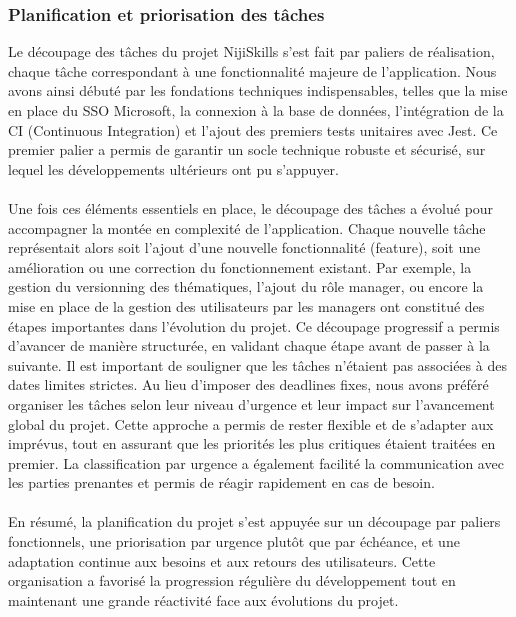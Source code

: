 \documentclass[12pt]{article}
\begin{document}
\subsubsection{Planification et priorisation des tâches}
Le découpage des tâches du projet NijiSkills s’est fait par paliers de réalisation, chaque tâche correspondant à une fonctionnalité majeure de l’application. Nous avons ainsi débuté par les fondations techniques indispensables, telles que la mise en place du SSO Microsoft, la connexion à la base de données, l’intégration de la CI (Continuous Integration) et l’ajout des premiers tests unitaires avec Jest. Ce premier palier a permis de garantir un socle technique robuste et sécurisé, sur lequel les développements ultérieurs ont pu s’appuyer.
\\\\
Une fois ces éléments essentiels en place, le découpage des tâches a évolué pour accompagner la montée en complexité de l’application. Chaque nouvelle tâche représentait alors soit l’ajout d’une nouvelle fonctionnalité (feature), soit une amélioration ou une correction du fonctionnement existant. Par exemple, la gestion du versionning des thématiques, l’ajout du rôle manager, ou encore la mise en place de la gestion des utilisateurs par les managers ont constitué des étapes importantes dans l’évolution du projet. Ce découpage progressif a permis d’avancer de manière structurée, en validant chaque étape avant de passer à la suivante.
Il est important de souligner que les tâches n’étaient pas associées à des dates limites strictes. Au lieu d’imposer des deadlines fixes, nous avons préféré organiser les tâches selon leur niveau d’urgence et leur impact sur l’avancement global du projet. Cette approche a permis de rester flexible et de s’adapter aux imprévus, tout en assurant que les priorités les plus critiques étaient traitées en premier. La classification par urgence a également facilité la communication avec les parties prenantes et permis de réagir rapidement en cas de besoin.
\\\\
En résumé, la planification du projet s’est appuyée sur un découpage par paliers fonctionnels, une priorisation par urgence plutôt que par échéance, et une adaptation continue aux besoins et aux retours des utilisateurs. Cette organisation a favorisé la progression régulière du développement tout en maintenant une grande réactivité face aux évolutions du projet.
\end{document}
